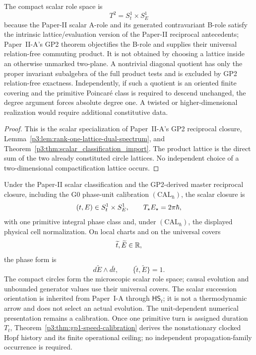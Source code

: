 \documentclass[12pt,a4paper]{article}
\begin{document}
\begin{lemma}
\label{p3:def:separable-scalar-compactification}
\label{p3:lem:separable-scalar-compactification}
The compact scalar role space is
\[
        T^2=S^1_t\times S^1_E
\]
because the Paper-II scalar A-role and its generated contravariant B-role
satisfy the intrinsic lattice/evaluation version of the Paper-II reciprocal
antecedents; Paper~II-A's GP2 theorem objectifies the B-role and supplies their universal relation-free
commuting product.  It is not
obtained by choosing a lattice inside an
otherwise unmarked two-plane.  A nontrivial diagonal quotient has only the
proper invariant subalgebra of the full product tests and is excluded by
GP2 relation-free exactness.  Independently, if such a quotient is an oriented
finite covering and the primitive Poincar\'e class is required to descend
unchanged, the degree argument forces absolute degree one.  A twisted or
higher-dimensional realization would require additional constitutive data.
\end{lemma}

\begin{proof}
This is the scalar specialization of
Paper~II-A's GP2 reciprocal closure, Lemma~\ref{p3:lem:rank-one-lattice-dual-spectrum},
and Theorem~\ref{p3:thm:scalar_classification_import}.  The product lattice is the
direct sum of the two already constituted circle lattices.  No independent
choice of a two-dimensional compactification lattice occurs.
\end{proof}

\begin{theorem}
\label{p3:thm:scalars}
Under the Paper-II scalar classification and the GP2-derived master
reciprocal closure, including the G0 phase-unit calibration
\((\mathrm{CAL}_{\hbar})\),
the scalar closure is
\[
        (t,E)\in S^1_t\times S^1_E,
        \qquad
        T_\star E_\star=2\pi\hbar,
\]
with one primitive integral phase class and, under $(\mathrm{CAL}_{\hbar})$, the displayed physical cell normalization.  On local charts and on the universal
covers
\[
        \widetilde t,\widetilde E\in\mathbb{R},
\]
the phase form is
\[
        d\widetilde E\wedge d\widetilde t,
        \qquad
        \{\widetilde t,\widetilde E\}=1.
\]
The compact circles form the microscopic scalar role space; causal evolution and
unbounded generator values use their universal covers.  The scalar succession
orientation is inherited from Paper~I-A through \(\mathsf{HS}_t\); it is not a
thermodynamic arrow and does not select an actual evolution.  The unit-dependent
numerical presentation remains a calibration.  Once one primitive turn is
assigned duration \(T_t\), Theorem~\ref{p3:thm:gp1-speed-calibration} derives
the nonstationary clocked Hopf history and its finite operational ceiling; no
independent propagation-family occurrence is required.
\end{theorem}
\end{document}

